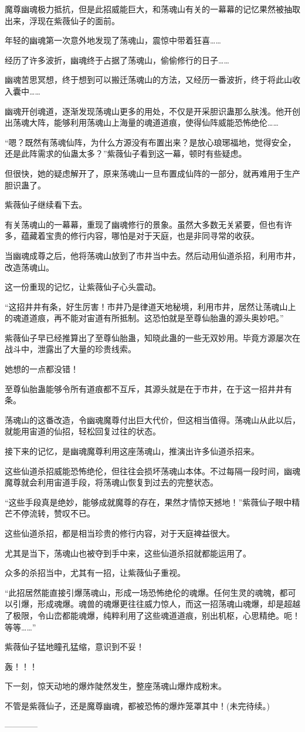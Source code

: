 \begin{this_body}
魔尊幽魂极力抵抗，但是此招威能巨大，和荡魂山有关的一幕幕的记忆果然被抽取出来，浮现在紫薇仙子的面前。

年轻的幽魂第一次意外地发现了荡魂山，震惊中带着狂喜……

经历了许多波折，幽魂终于占据了荡魂山，偷偷修行的日子……

幽魂苦思冥想，终于想到可以搬迁荡魂山的方法，又经历一番波折，终于将此山收入囊中……

幽魂开创魂道，逐渐发现荡魂山更多的用处，不仅是开采胆识蛊那么肤浅。他开创出荡魂大阵，能够利用荡魂山上海量的魂道道痕，使得仙阵威能恐怖绝伦……

“嗯？既然有荡魂仙阵，为什么方源没有布置出来？是放心琅琊福地，觉得安全，还是此阵需求的仙蛊太多？”紫薇仙子看到这一幕，顿时有些疑虑。

但很快，她的疑虑解开了，原来荡魂山一旦布置成仙阵的一部分，就再难用于生产胆识蛊了。

紫薇仙子继续看下去。

有关荡魂山的一幕幕，重现了幽魂修行的景象。虽然大多数无关紧要，但也有许多，蕴藏着宝贵的修行内容，哪怕是对于天庭，也是非同寻常的收获。

当幽魂成尊之后，他将荡魂山放到了市井当中去。然后动用仙道杀招，利用市井，改造荡魂山。

这一份重现的记忆，让紫薇仙子心头震动。

“这招井井有条，好生厉害！市井乃是律道天地秘境，利用市井，居然让荡魂山上的魂道道痕，再不能对宙道有所抵制。这恐怕就是至尊仙胎蛊的源头奥妙吧。”

紫薇仙子早已经推算出了至尊仙胎蛊，知晓此蛊的一些无双妙用。毕竟方源屡次在战斗中，泄露出了大量的珍贵线索。

她想的一点都没错！

至尊仙胎蛊能够令所有道痕都不互斥，其源头就是在于市井，在于这一招井井有条。

荡魂山的这番改造，令幽魂魔尊付出巨大代价，但这相当值得。荡魂山从此以后，就能用宙道的仙招，轻松回复过往的状态。

接下来的记忆，是幽魂魔尊利用这座荡魂山，推演出许多仙道杀招来。

这些仙道杀招威能恐怖绝伦，但往往会损坏荡魂山本体。不过每隔一段时间，幽魂魔尊就会利用宙道手段，将荡魂山恢复到过去的完整状态。

“这些手段真是绝妙，能够成就魔尊的存在，果然才情惊天撼地！”紫薇仙子眼中精芒不停流转，赞叹不已。

这些仙道杀招，都是相当珍贵的修行内容，对于天庭裨益很大。

尤其是当下，荡魂山也被夺到手中来，这些仙道杀招就都能运用了。

众多的杀招当中，尤其有一招，让紫薇仙子重视。

“此招居然能直接引爆荡魂山，形成一场恐怖绝伦的魂爆。任何生灵的魂魄，都可以引爆，形成魂爆。魂兽的魂爆更往往威力惊人，而这一招荡魂山魂爆，却是超越了极限，令山峦都能魂爆，纯粹利用了这些魂道道痕，别出机枢，心思精绝。呃！等等……”

紫薇仙子猛地瞳孔猛缩，意识到不妥！

轰！！！

下一刻，惊天动地的爆炸陡然发生，整座荡魂山爆炸成粉末。

不管是紫薇仙子，还是魔尊幽魂，都被恐怖的爆炸笼罩其中！(未完待续。)

------------

\end{this_body}

